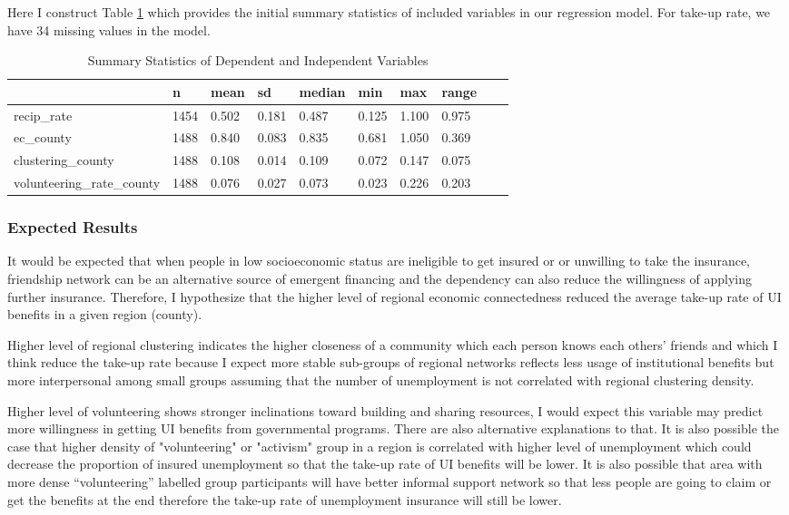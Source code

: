 \documentclass{article}
\begin{document}
Here I construct Table \ref{summ stats} which provides the initial summary statistics of included variables in our regression model. For take-up rate, we have 34 missing values in the model.


\begin{table}
\centering
\begin{tabular}[h]{|m|m|m|m|m|m|m|m|m|m|}
\hline
  & n & mean & sd & median & min & max & range\\
\hline
recip\_rate & 1454 & 0.502 & 0.181 & 0.487 & 0.125 & 1.100 & 0.975\\
\hline
ec\_county & 1488 & 0.840 & 0.083 & 0.835 & 0.681 & 1.050 & 0.369\\
\hline
clustering\_county & 1488 & 0.108 & 0.014 & 0.109 & 0.072 & 0.147 & 0.075\\
\hline
volunteering\_rate\_county & 1488 & 0.076 & 0.027 & 0.073 & 0.023 & 0.226 & 0.203\\
\hline
\end{tabular}
\caption{Summary Statistics of Dependent and Independent Variables}
\label{summ stats}
\end{table}


\subsubsection{Expected Results}
It would be expected that when people in low socioeconomic status are ineligible to get insured or or unwilling to take the insurance, friendship network can be an alternative source of emergent financing and the dependency can also reduce the willingness of applying further insurance. Therefore, I hypothesize that the higher level of regional economic connectedness reduced the average take-up rate of UI benefits in a given region (county).

Higher level of regional clustering indicates the higher closeness of a community which each person knows each others' friends and which I think reduce the take-up rate because I expect more stable sub-groups of regional networks reflects less usage of institutional benefits but more interpersonal among small groups assuming that the number of unemployment is not correlated with regional clustering density.

Higher level of volunteering shows stronger inclinations toward building and sharing resources, I would expect this variable may predict more willingness in getting UI benefits from governmental programs. There are also alternative explanations to that. It is also possible the case that higher density of "volunteering" or "activism" group in a region is correlated with higher level of unemployment which could decrease the proportion of insured unemployment so that the take-up rate of UI benefits will be lower. It is also possible that area with more dense ``volunteering'' labelled group participants will have better informal support network so that less people are going to claim or get the benefits at the end therefore the take-up rate of unemployment insurance will still be lower. 
\end{document}
